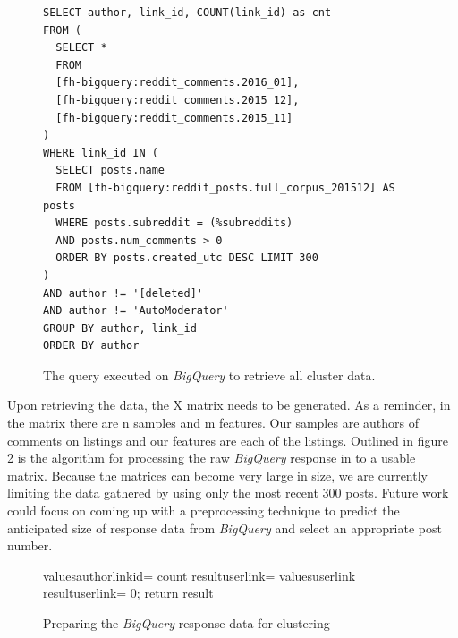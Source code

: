 \documentclass[msc,oneside]{ubcthesis}%
\begin{document}
\begin{figure}[H]
\begin{lstlisting}
SELECT author, link_id, COUNT(link_id) as cnt 
FROM ( 
  SELECT * 
  FROM 
  [fh-bigquery:reddit_comments.2016_01], 
  [fh-bigquery:reddit_comments.2015_12], 
  [fh-bigquery:reddit_comments.2015_11] 
)
WHERE link_id IN ( 
  SELECT posts.name 
  FROM [fh-bigquery:reddit_posts.full_corpus_201512] AS posts 
  WHERE posts.subreddit = (%subreddits) 
  AND posts.num_comments > 0 
  ORDER BY posts.created_utc DESC LIMIT 300 
) 
AND author != '[deleted]' 
AND author != 'AutoModerator' 
GROUP BY author, link_id 
ORDER BY author
\end{lstlisting}
\caption[BigQuery for retrieving clustering data]{
The query executed on \textit{BigQuery} to retrieve all cluster data.}
\label{fig:clusterquery}
\end{figure}

Upon retrieving the data, the X matrix needs to be generated. As a reminder, in the matrix there are n samples and m features. Our samples are authors of comments on listings and our features are each of the listings. Outlined in figure \ref{fig:responsealgo} is the algorithm for processing the raw \textit{BigQuery} response in to a usable matrix. Because the matrices can become very large in size, we are currently limiting the data gathered by using only the most recent 300 posts. Future work could focus on coming up with a preprocessing technique to predict the anticipated size of response data from \textit{BigQuery} and select an appropriate post number.

\begin{figure}[H]
	\begin{algorithm}[H]
		\SetAlgoLined
   	 	{
   	 		values\lbrack author\rbrack\lbrack linkid\rbrack = count\;
    		}
    		{
    			{
    				 {
    					result\lbrack user\rbrack\lbrack link\rbrack = values\lbrack user\rbrack\lbrack link\rbrack\;
    				}{
    					result\lbrack user\rbrack\lbrack link\rbrack = 0;
    				}
    			}
    		}
    		return result\;
    	\end{algorithm}
\caption{Preparing the \textit{BigQuery} response data for clustering}
\label{fig:responsealgo}
\end{figure}
\end{document}
